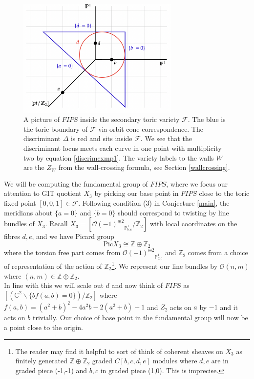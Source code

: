 \documentclass[oneside]{amsart}
\theoremstyle{definition}
\theoremstyle{definition}
\theoremstyle{definition}
\theoremstyle{definition}
\newcommand{\CC}{\mathbb{C}}
\newcommand{\PP}{\mathbb{P}}
\newcommand{\Z}{\mathbb{Z}}
\newcommand{\Fs}{\mathcal{F}}
\begin{document}
\begin{figure}[!h]
    \centering
    \includegraphics[width=8cm]{rank2exmp/secondarypolytope.png}
    \caption{A picture of $FIPS$ inside the secondary toric variety $\Fs$. The blue is the toric boundary of $\Fs$ via orbit-cone correspondence. The discriminant $\Delta$ is red and sits inside $\Fs$. We see that the discriminant locus meets each curve in one point with multiplicity two by equation \eqref{discrimexmp1}. The variety labels to the walls $W$ are the $Z_W$ from the wall-crossing formula, see Section \ref{wallcrossing}.}
\end{figure}
We will be computing the fundamental group of $FIPS$, where we focus our attention to GIT quotient $X_3$ by picking our base point in $FIPS$ close to the toric fixed point $[0,0,1]\in \Fs$. Following condition (3) in Conjecture \ref{main}, the meridians about $\{a=0 \}$ and $\{b = 0 \}$ should correspond to twisting by line bundles of $X_3$. Recall $X_3 = \left[{\mathcal{O}(-1)^{\oplus 2}}_{\PP^1_{b:c}} / \Z_2 \right]$ with local coordinates on the fibres $d,e$, and we have Picard group
\begin{equation}
\text{Pic} X_3 \cong \Z \oplus \Z_2
\label{picX3}
\end{equation}
where the torsion free part comes from ${\mathcal{O}(-1)^{\oplus 2}}_{\PP^1_{b:c}}$ and $\Z_2$ comes from a choice of representation of the action of $\Z_2$\footnote{The reader may find it helpful to sort of think of coherent sheaves on $X_3$ as finitely generated $\Z \oplus \Z_2$ graded $C[b,c,d,e]$ modules where $d,e$ are in graded piece (-1,-1) and $b,c$ in graded piece (1,0). This is imprecise.}. We represent our line bundles by $\mathcal{O} (n,m)$ where $(n,m) \in \Z \oplus \Z_2$. \\
\newline
In line with this we will scale out $d$ and now think of $FIPS$ as $\left[ (\CC^2 \backslash \{bf(a,b)=0\} ) / \Z_2 \right]$ where $f(a,b)=(a^2 + b )^2 -4a^2b -2(a^2 + b) +1$ and $Z_2$ acts on $a$ by $-1$ and it acts on $b$ trivially. Our choice of base point in the fundamental group will now be a point close to the origin.\\
\end{document}
